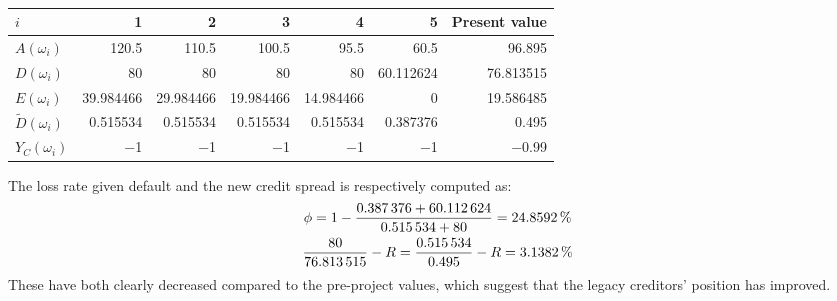 \documentclass[../main.tex]{subfiles}
\begin{document}
        \begin{table}[H]
            \centering
            \begin{tabular}{l|rrrrr||r}
                $i$ & 1 & 2 & 3 & 4 & 5 & Present value \\
                \hline
                $A(\omega_{i})$ & 
                    \num{120.5} & \num{110.5} & \num{100.5} & \num{95.5} & \num{60.5} & \num{96.895} \\
                $D(\omega_{i})$ & 
                    \num{80} & \num{80} & \num{80} & \num{80} & \num{60.112624} & \num{76.813515} \\
                $E(\omega_{i})$ & 
                    \num{39.984466} & \num{29.984466} & \num{19.984466} & \num{14.984466} & \num{0} & \num{19.586485}\\
                $\tilde{D}(\omega_{i})$ & 
                    \num{0.515534} & \num{0.515534} & \num{0.515534} & \num{0.515534} & \num{0.387376} & \num{0.495}\\
                $Y_C(\omega_{i})$ & 
                    \num{-1} & \num{-1} & \num{-1} & \num{-1} & \num{-1} & \num{-0.99} \\
            \end{tabular}
            \caption{}
            \label{tbl:example-collateralized-derivative}
        \end{table}
        The loss rate given default and the new credit spread is respectively computed as:
            \begin{gather}
                \phi 
                = 
                    1 
                    - 
                    \frac{
                        \num{0.387376}+\num{60.112624}
                    }{
                        \num{0.515534}+\num{80}
                    }
                = 
                    \pct{0.248592}
                \\
                    \frac{
                        \num{80}    
                    }{
                        \num{76.813515} 
                    } 
                    - 
                    \grossrfrate 
                = 
                    \frac{
                        \num{0.515534}
                    }{        
                        \num{0.495}
                    } 
                    -
                    \grossrfrate 
                = 
                    \pct{0.031382} 
            \end{gather}
        These have both clearly decreased compared to the pre-project values, 
        which suggest that the legacy creditors' position has improved.
\end{document}
